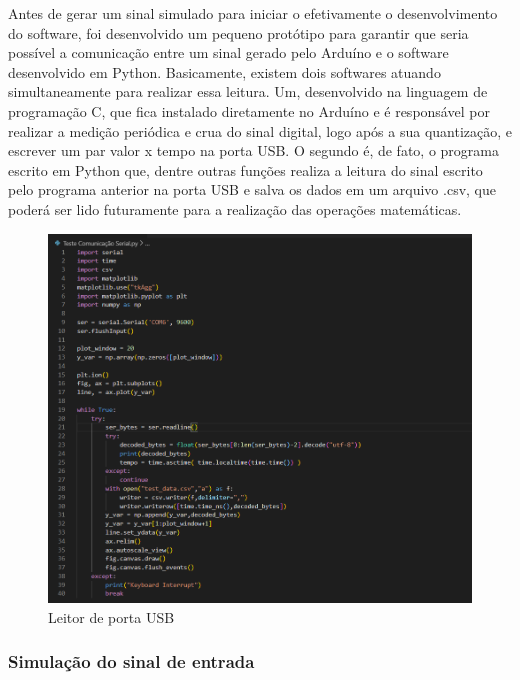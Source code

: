 Antes de gerar um sinal simulado para iniciar o efetivamente o desenvolvimento do software, foi desenvolvido um pequeno protótipo para garantir que seria possível a comunicação entre um sinal gerado pelo Arduíno e o software desenvolvido em Python. Basicamente, existem dois softwares atuando simultaneamente para realizar essa leitura. Um, desenvolvido na linguagem de programação C, que fica instalado diretamente no Arduíno e é responsável por realizar a medição periódica e crua do sinal digital, logo após a sua quantização, e escrever um par valor x tempo na porta USB. O segundo é, de fato, o programa escrito em Python que, dentre outras funções realiza a leitura do sinal escrito pelo programa anterior na porta USB e salva os dados em um arquivo .csv, que poderá ser lido futuramente para a realização das operações matemáticas.


\begin{figure}[h!]
	\begin{center}
		\includegraphics[width=1\linewidth]{images/LeitorDeUSB.png}
		\caption{Leitor de porta USB}
		\label{fig:LeitorDeUSB}
	\end{center}
\end{figure}


\subsubsection{Simulação do sinal de entrada}

